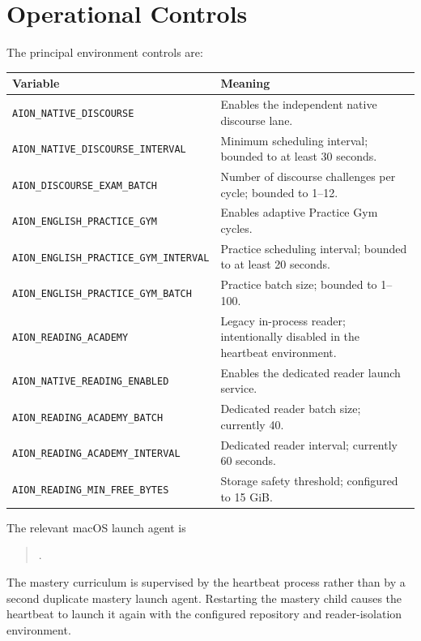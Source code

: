 \documentclass[11pt,a4paper]{article}
\begin{document}
\section{Operational Controls}

The principal environment controls are:

\begin{longtable}{p{} p{}}
\toprule
Variable & Meaning \\
\midrule
\endhead
\texttt{AION\_NATIVE\_DISCOURSE} & Enables the independent native discourse lane. \\
\texttt{AION\_NATIVE\_DISCOURSE\_INTERVAL} & Minimum scheduling interval; bounded to at least
30 seconds. \\
\texttt{AION\_DISCOURSE\_EXAM\_BATCH} & Number of discourse challenges per cycle; bounded to
1--12. \\
\texttt{AION\_ENGLISH\_PRACTICE\_GYM} & Enables adaptive Practice Gym cycles. \\
\texttt{AION\_ENGLISH\_PRACTICE\_GYM\_INTERVAL} & Practice scheduling interval; bounded to at
least 20 seconds. \\
\texttt{AION\_ENGLISH\_PRACTICE\_GYM\_BATCH} & Practice batch size; bounded to 1--100. \\
\texttt{AION\_READING\_ACADEMY} & Legacy in-process reader; intentionally disabled in the
heartbeat environment. \\
\texttt{AION\_NATIVE\_READING\_ENABLED} & Enables the dedicated reader launch service. \\
\texttt{AION\_READING\_ACADEMY\_BATCH} & Dedicated reader batch size; currently 40. \\
\texttt{AION\_READING\_ACADEMY\_INTERVAL} & Dedicated reader interval; currently 60 seconds. \\
\texttt{AION\_READING\_MIN\_FREE\_BYTES} & Storage safety threshold; configured to 15 GiB. \\
\bottomrule
\end{longtable}

The relevant macOS launch agent is

\begin{quote}
.
\end{quote}

The mastery curriculum is supervised by the heartbeat process rather than by a second duplicate
mastery launch agent. Restarting the mastery child causes the heartbeat to launch it again with
the configured repository and reader-isolation environment.
\end{document}
